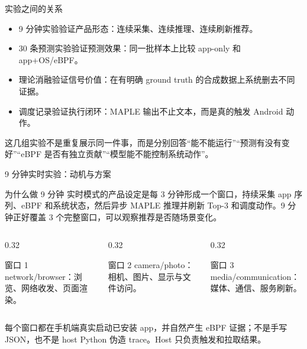 \documentclass[UTF8,aspectratio=169,10pt]{ctexbeamer}
\newcommand{\explainfoot}[1]{%
  \vspace{0.35em}
  {\scriptsize\color{memoGray}#1}
}
\begin{document}
\begin{frame}{实验之间的关系}
  \begin{itemize}
    \item 9 分钟实验验证产品形态：连续采集、连续推理、连续刷新推荐。
    \item 30 条预测实验验证预测效果：同一批样本上比较 app-only 和 app+OS/eBPF。
    \item 理论消融验证信号价值：在有明确 ground truth 的合成数据上系统删去不同证据。
    \item 调度记录验证执行闭环：MAPLE 输出不止文本，而是真的触发 Android 动作。
  \end{itemize}
  \explainfoot{这几组实验不是重复展示同一件事，而是分别回答“能不能运行”“预测有没有变好”“eBPF 是否有独立贡献”“模型能不能控制系统动作”。}
\end{frame}

\begin{frame}{9 分钟实时实验：动机与方案}
  \begin{block}{为什么做 9 分钟}
    实时模式的产品设定是每 3 分钟形成一个窗口，持续采集 app 序列、eBPF 和系统状态，然后异步 MAPLE 推理并刷新 Top-3 和调度动作。9 分钟正好覆盖 3 个完整窗口，可以观察推荐是否随场景变化。
  \end{block}
  \begin{columns}[T,totalwidth=\textwidth]
    \begin{column}{0.32\textwidth}
      \begin{block}{窗口 1}
        network/browser：浏览、网络收发、页面渲染。
      \end{block}
    \end{column}
    \begin{column}{0.32\textwidth}
      \begin{block}{窗口 2}
        camera/photo：相机、图片、显示与文件访问。
      \end{block}
    \end{column}
    \begin{column}{0.32\textwidth}
      \begin{block}{窗口 3}
        media/communication：媒体、通信、服务刷新。
      \end{block}
    \end{column}
  \end{columns}
  \explainfoot{每个窗口都在手机端真实启动已安装 app，并自然产生 eBPF 证据；不是手写 JSON，也不是 host Python 伪造 trace。Host 只负责触发和拉取结果。}
\end{frame}
\end{document}
